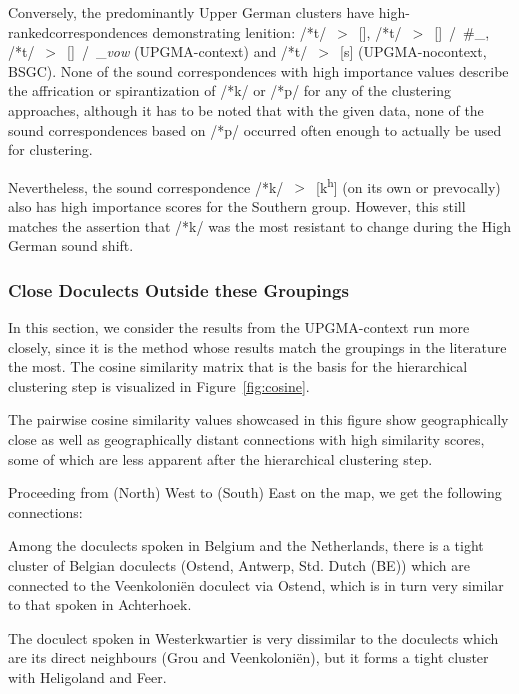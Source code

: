\documentclass[a4paper]{article}
\begin{document}
Conversely, the predominantly Upper German clusters
have high-ranked\linebreak correspondences demonstrating lenition:
/*t/~$>$~[], /*t/~$>$~[]~/~\#\_,\linebreak
/*t/~$>$~[]~/~\_\textit{vow} (UPGMA-context)
and /*t/~$>$~[s] (UPGMA-nocontext, BSGC).
None of the sound correspondences with high importance values
describe the affrication or spirantization of /*k/ or /*p/
for any of the clustering approaches,
although it has to be noted that with the given data,
none of the sound correspondences based on /*p/
occurred often enough to actually be used for clustering.

Nevertheless, the sound correspondence /*k/~$>$~[k\textsuperscript{h}]
(on its own or prevocally) also has high importance scores
for the Southern group.
However, this still matches the assertion that /*k/
was the most resistant to change during the High German sound shift.

\subsubsection{Close Doculects Outside these Groupings}
\label{subsubsec:cosine}

In this section, we consider the results from
the UPGMA-context run more closely,
since it is the method whose results match the
groupings in the literature the most.
The cosine similarity matrix that is the basis for the
hierarchical clustering step is visualized in Figure~\ref{fig:cosine}.

The pairwise cosine similarity values showcased in this figure
show geographically close as well as geographically distant connections
with high similarity scores,
some of which are less apparent after the hierarchical clustering step.

Proceeding from (North) West to (South) East on the map,
we get the following connections:

Among the doculects spoken in Belgium and the Netherlands,
there is a tight cluster of Belgian doculects (Ostend, Antwerp, Std. Dutch (BE))
which are connected to the Veenkoloni\"{e}n doculect via Ostend,
which is in turn very similar to that spoken in Achterhoek.

The doculect spoken in Westerkwartier is very dissimilar to
the doculects which are its direct neighbours (Grou and Veenkoloni\"{e}n),
but it forms a tight cluster with Heligoland and Feer.
\end{document}

